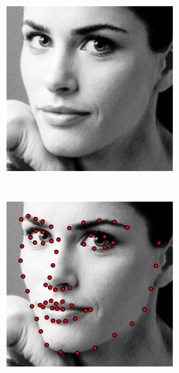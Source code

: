 \begin{figure}[t!]
    \centering
    \begin{subfigure}[b]{0.125\textwidth}
            \includegraphics[width=\textwidth]{resources/intro_0_0}
    \end{subfigure}
    ~
    \begin{subfigure}[b]{0.125\textwidth}
            \includegraphics[width=\textwidth]{resources/intro_0_1}

\end{subfigure}
\end{figure}
